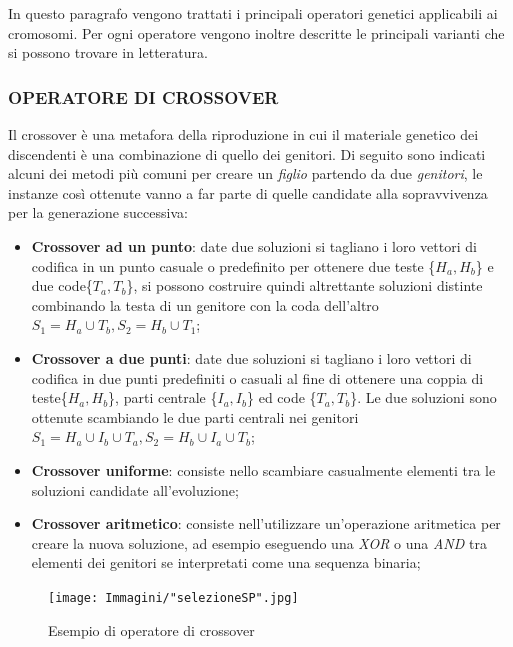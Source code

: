 \documentclass[11pt]{article}
\begin{document}
In questo paragrafo vengono trattati i principali operatori genetici applicabili ai cromosomi. Per ogni operatore vengono inoltre descritte le principali varianti che si possono trovare in letteratura.

\subsubsection*{OPERATORE DI CROSSOVER}

Il crossover è una metafora della riproduzione in cui il materiale genetico dei discendenti è una combinazione di quello dei genitori. Di seguito sono indicati alcuni dei metodi più comuni per creare un \textit{figlio} partendo da due \textit{genitori}, le instanze così ottenute vanno a far parte di quelle candidate alla sopravvivenza per la generazione successiva:

\begin{itemize}
    \item \textbf{Crossover ad un punto}: date due soluzioni si tagliano i loro vettori di codifica in un punto casuale o predefinito per ottenere due teste \{$H_a, H_b$\} e due code\{$T_a, T_b$\}, si possono costruire quindi altrettante soluzioni distinte combinando la testa di un genitore con la coda dell'altro $S_1 = H_a \cup T_b , S_2 = H_b \cup T_1$;
    
    \item \textbf{Crossover a due punti}: date due soluzioni si tagliano i loro vettori di codifica in due punti predefiniti o casuali al fine di ottenere una coppia di teste\{$H_a, H_b$\}, parti centrale \{$I_a, I_b$\} ed code \{$T_a, T_b$\}. Le due soluzioni sono ottenute scambiando le due parti centrali nei genitori $S_1 = H_a \cup I_b \cup T_a , S_2 = H_b \cup I_a \cup T_b$;
    
    \item \textbf{Crossover uniforme}: consiste nello scambiare casualmente elementi tra le soluzioni candidate all'evoluzione;
    
    \item \textbf{Crossover aritmetico}: consiste nell'utilizzare un'operazione aritmetica per creare la nuova soluzione, ad esempio eseguendo una \textit{XOR} o una \textit{AND} tra elementi dei genitori se interpretati come una sequenza binaria;
\end{itemize}

\begin{figure}[htbp]
    \centering
    \texttt{[image: Immagini/"selezioneSP".jpg]}
    \caption{Esempio di operatore di crossover}
\end{figure}
\end{document}
